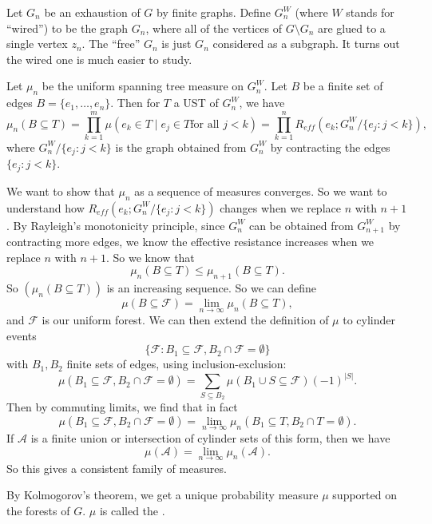 \documentclass[a4paper]{article}
\begin{document}
Let $G_n$ be an exhaustion of $G$ by finite graphs. Define $G_n^W$ (where $W$ stands for ``wired'') to be the graph $G_n$, where all of the vertices of $G \setminus G_n$ are glued to a single vertex $z_n$. The ``free'' $G_n$ is just $G_n$ considered as a subgraph. It turns out the wired one is much easier to study.

Let $\mu_n$ be the uniform spanning tree measure on $G_n^W$. Let $B$ be a finite set of edges $B = \{e_1, \ldots, e_n\}$. Then for $T$ a UST of $G_n^W$, we have
\[
  \mu_n(B \subseteq T) = \prod_{k = 1}^m \mu(e_k \in T \mid e_j \in T\text{for all }j < k) = \prod_{k = 1}^n R_{eff}(e_k; G_n^W/\{e_j: j < k\}),
\]
where $G_n^W/\{e_j: j < k\}$ is the graph obtained from $G_n^W$ by contracting the edges $\{e_j: j < k\}$.

We want to show that $\mu_n$ as a sequence of measures converges. So we want to understand how $R_{eff}(e_k; G_n^W/\{e_j: j < k\})$ changes when we replace $n$ with $n + 1$. By Rayleigh's monotonicity principle, since $G_n^W$ can be obtained from $G_{n + 1}^W$ by contracting more edges, we know the effective resistance increases when we replace $n$ with $n + 1$. So we know that
\[
  \mu_n(B \subseteq T) \leq \mu_{n + 1}(B \subseteq T).
\]
So $(\mu_n(B \subseteq T))$ is an increasing sequence. So we can define
\[
  \mu(B \subseteq \mathcal{F}) = \lim_{n \to \infty} \mu_n(B \subseteq T),
\]
and $\mathcal{F}$ is our uniform forest. We can then extend the definition of $\mu$ to cylinder events
\[
  \{\mathcal{F}: B_1 \subseteq \mathcal{F}, B_2 \cap \mathcal{F} = \emptyset\}
\]
with $B_1, B_2$ finite sets of edges, using inclusion-exclusion:
\[
  \mu(B_1 \subseteq \mathcal{F}, B_2 \cap \mathcal{F} = \emptyset) = \sum_{S \subseteq B_2} \mu(B_1 \cup S \subseteq \mathcal{F}) (-1)^{|S|}.
\]
Then by commuting limits, we find that in fact
\[
  \mu(B_1 \subseteq \mathcal{F}, B_2 \cap \mathcal{F} = \emptyset) = \lim_{n \to \infty} \mu_n (B_1 \subseteq T, B_2 \cap T = \emptyset).
\]
If $\mathcal{A}$ is a finite union or intersection of cylinder sets of this form, then we have
\[
  \mu(\mathcal{A}) = \lim_{n \to \infty} \mu_n(\mathcal{A}).
\]
So this gives a consistent family of measures.

By Kolmogorov's theorem, we get a unique probability measure $\mu$ supported on the forests of $G$. $\mu$ is called the .
\printindex
\end{document}
